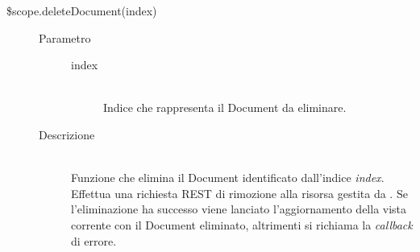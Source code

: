 \begin{description}
\begin{description}
  
  
  \item[\$scope.deleteDocument(index)] \hfill
  \begin{description}
  	\item[Parametro] \hfill
  		\begin{description}
  			\item[index] \hfill \\
  			Indice che rappresenta il Document da eliminare.
       \end{description}
  	\item[Descrizione] \hfill \\
     Funzione che elimina il Document identificato dall'indice \textit{index}. Effettua una richiesta REST di rimozione alla risorsa gestita da .
  Se l'eliminazione ha successo viene lanciato l'aggiornamento della vista corrente con il Document eliminato, altrimenti si richiama la \textit{callback} di errore.
    \end{description}
    

  
 \end{description}
\end{description}

